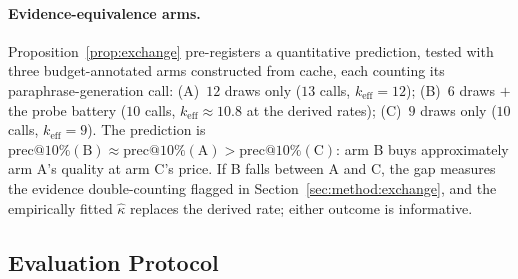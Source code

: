 \documentclass[11pt]{article}
\makeatletter
\newcommand{\precat}[1]{\mathrm{prec}@#1}
\newcommand{\keff}{k_{\mathrm{eff}}}
\makeatother
\begin{document}
\paragraph{Evidence-equivalence arms.} Proposition~\ref{prop:exchange}
pre-registers a quantitative prediction, tested with three
budget-annotated arms constructed from cache, each counting its
paraphrase-generation call: (A)~$12$ draws only ($13$ calls,
$\keff = 12$); (B)~$6$ draws $+$ the probe battery ($10$ calls,
$\keff \approx 10.8$ at the derived rates); (C)~$9$ draws only
($10$ calls, $\keff = 9$). The prediction is
$\precat{10\%}(\mathrm{B}) \approx \precat{10\%}(\mathrm{A}) >
\precat{10\%}(\mathrm{C})$: arm B buys approximately arm A's quality at
arm C's price. If B falls between A and C, the gap measures the
evidence double-counting flagged in
Section~\ref{sec:method:exchange}, and the empirically fitted
$\hat\kappa$ replaces the derived rate; either outcome is
informative.

\subsection{Evaluation Protocol}
\label{sec:exp:eval}
\end{document}
